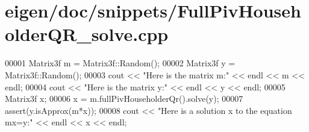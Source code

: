 \hypertarget{eigen_2doc_2snippets_2_full_piv_householder_q_r__solve_8cpp_source}{}\section{eigen/doc/snippets/\+Full\+Piv\+Householder\+Q\+R\+\_\+solve.cpp}
\label{eigen_2doc_2snippets_2_full_piv_householder_q_r__solve_8cpp_source}

\begin{DoxyCode}
00001 Matrix3f m = Matrix3f::Random();
00002 Matrix3f y = Matrix3f::Random();
00003 cout << \textcolor{stringliteral}{"Here is the matrix m:"} << endl << m << endl;
00004 cout << \textcolor{stringliteral}{"Here is the matrix y:"} << endl << y << endl;
00005 Matrix3f x;
00006 x = m.fullPivHouseholderQr().solve(y);
00007 assert(y.isApprox(m*x));
00008 cout << \textcolor{stringliteral}{"Here is a solution x to the equation mx=y:"} << endl << x << endl;
\end{DoxyCode}
